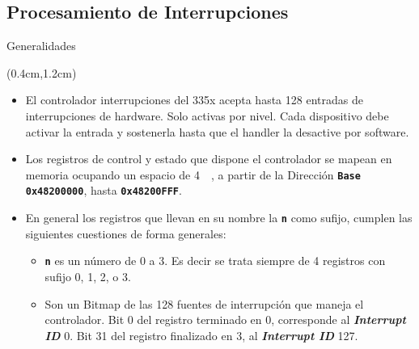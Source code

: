 \documentclass[usenames,table,xcolor={x11names},aspectratio=169]{beamer}
\begin{document}
\subsection{Procesamiento de Interrupciones}
\begin{frame}[t]{Generalidades}
 \begin{textblock*}{\textwidth}(0.4cm,1.2cm)
  \begin{itemize}[<+(1)->]\justifying \parskip 0.16cm
   \item El controlador interrupciones del 335x acepta hasta 128 entradas de interrupciones de hardware. Solo activas por nivel. Cada dispositivo debe activar la entrada y sostenerla hasta que el handler la desactive por software.
   \item Los registros de control y estado que dispone el controlador se mapean en memoria ocupando un espacio de \SI{4}{\kibi\byte}, a partir de la Dirección \texttt{\textbf{Base 0x48200000}}, hasta \texttt{\textbf{0x48200FFF}}.
   \item En general los registros que llevan en su nombre la \texttt{\textbf{n}} como sufijo, cumplen las siguientes cuestiones de forma generales:
   \begin{itemize}[<+->]\justifying
    \item \texttt{\textbf{n}} es un número de 0 a 3. Es decir se trata siempre de 4 registros con sufijo 0, 1, 2, o 3.
    \item Son un Bitmap de las 128 fuentes de interrupción que maneja el controlador. Bit 0 del registro terminado en 0, corresponde al \textbf{\textit{Interrupt ID}} 0. Bit 31 del registro finalizado en 3, al \textbf{\textit{Interrupt ID}} 127.
   \end{itemize}
  \end{itemize}
 \end{textblock*}
\end{frame}
   
\end{document}
